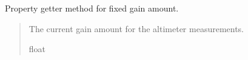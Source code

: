 \documentclass[letterpaper,10pt,english]{sphinxmanual}
\begin{document}
\begin{fulllineitems}

\begin{fulllineitems}
\label{\detokenize{modules/fusion/altimeter:qnav.fusion.altimeter.FixedGainAltimeter.fixed_gain}}
\pysigstartsignatures
{}
\pysigstopsignatures
\sphinxAtStartPar
Property getter method for fixed gain amount.
\begin{quote}\begin{description}
\sphinxAtStartPar
The current gain amount for the altimeter measurements.

\sphinxAtStartPar
float

\end{description}\end{quote}

\end{fulllineitems}


\end{fulllineitems}

\end{document}
